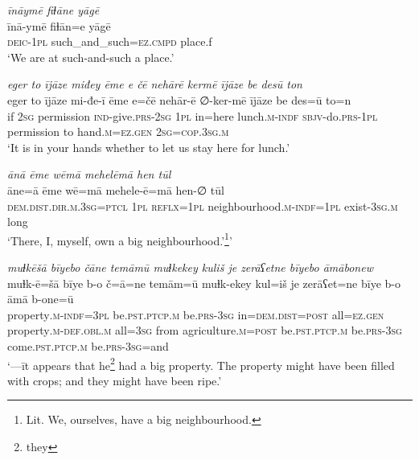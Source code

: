 \ea \label{PM.12}
\textit{īnāymē fiɫāne yāgē} \\ 
\gll īnā-ymē fiɫān=e yāgē \\ 
 \textsc{deic-1pl} such\_and\_such\textsc{=ez}\textsc{.cmpd} place.f \\ 
\glt `We are at such-and-such a place.'
\z 
 
\ea \label{PM.14}
\textit{eger to ījāze miđey ēme e čē nehārē kermē ījāze be desū ton} \\ 
\gll eger to ījāze mi-đe-ī ēme e=čē nehār-ē ∅-ker-mē ījāze be des=ū to=n \\ 
 if \textsc{2sg} permission \textsc{ind-}give\textsc{.prs}-\textsc{2sg} \textsc{1pl} in=here lunch\textsc{.m}\textsc{-indf} \textsc{sbjv-}do\textsc{.prs}\textsc{-1pl} permission to hand\textsc{.m}\textsc{\textsc{=ez.gen}} \textsc{2sg}\textsc{=cop}\textsc{.3sg}\textsc{.m} \\ 
\glt `It is in your hands whether to let us stay here for lunch.'
\z 
 
\ea \label{PM.17}
\textit{ānā ēme wēmā mehelēmā hen tūl} \\ 
\gll āne=ā ēme wē=mā mehele-ē=mā hen-∅ tūl \\ 
 \textsc{dem.dist}\textsc{.dir}\textsc{.m}\textsc{.3sg}=\textsc{ptcl} \textsc{1pl} \textsc{reflx}\textsc{=1pl} neighbourhood\textsc{.m}\textsc{-indf}\textsc{=1pl} exist\textsc{-3sg}\textsc{.m} long \\ 
\glt `There, I, myself, own a big neighbourhood.’\footnote{Lit. We, ourselves, have a big neighbourhood.}'
\z 
 
\ea \label{PM.18}
\textit{muɫkēšā bīyebo čāne temāmū muɫkekey kuliš je zerāʕetne bīyebo āmābonew} \\ 
\gll muɫk-ē=šā bīye b-o č=ā=ne temām=ū muɫk-ekey kul=iš je zerāʕet=ne bīye b-o āmā b-one=ū \\ 
 property\textsc{.m}\textsc{-indf}\textsc{=3pl} be\textsc{.pst}\textsc{.ptcp}\textsc{.m} be\textsc{.prs}\textsc{-3sg} in=\textsc{dem.dist}\textsc{=\textsc{post}} all\textsc{\textsc{=ez.gen}} property\textsc{.m}\textsc{-def}\textsc{.obl}\textsc{.m} all\textsc{=3sg} from agriculture\textsc{.m}\textsc{=\textsc{post}} be\textsc{.pst}\textsc{.ptcp}\textsc{.m} be\textsc{.prs}\textsc{-3sg} come\textsc{.pst}\textsc{.ptcp}\textsc{.m} be\textsc{.prs}\textsc{-3sg}=and \\ 
\glt `—īt appears that he\footnote{they} had a big property. The property might have been filled with crops; and they might have been ripe.'
\z 
 
